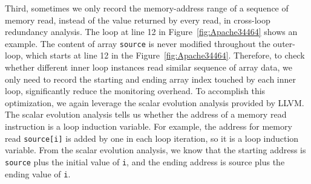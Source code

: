 Third, sometimes we only record the memory-address range of a sequence of memory
read, instead of the value returned by every read, in cross-loop redundancy
analysis. 
The loop at line 12 in Figure~\ref{fig:Apache34464} shows an example.
The content of array \texttt{source} is never modified
throughout the outer-loop, which starts 
at line 12 in the Figure~\ref{fig:Apache34464}.
Therefore, to check whether different inner loop instances read similar
sequence of array data, we only need to record the starting and 
ending array index touched by each inner loop, significantly reduce the 
monitoring overhead. To accomplish this optimization, we again leverage
the scalar evolution analysis provided by LLVM. The scalar evolution analysis
tells us whether the address of a memory read instruction
is a loop induction variable. For example, the address for memory read \texttt{source[i]} is added by one in each loop iteration,
so it is a loop induction variable. 
From the scalar evolution analysis, we know that the starting address is \texttt{source} plus the initial value of \texttt{i}, and the ending address
is source plus the ending value of \texttt{i}.  

